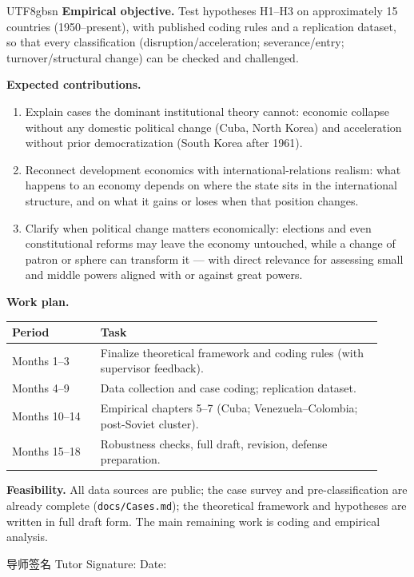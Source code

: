 \documentclass[10pt]{article}
\begin{document}
\begin{CJK}{UTF8}{gbsn}
\noindent\textbf{Empirical objective.} Test hypotheses H1--H3 on approximately 15 countries (1950--present), with published coding rules and a replication dataset, so that every classification (disruption/acceleration; severance/entry; turnover/structural change) can be checked and challenged.

\noindent\textbf{Expected contributions.}
\begin{enumerate}
    \item Explain cases the dominant institutional theory cannot: economic collapse without any domestic political change (Cuba, North Korea) and acceleration without prior democratization (South Korea after 1961).
    \item Reconnect development economics with international-relations realism: what happens to an economy depends on where the state sits in the international structure, and on what it gains or loses when that position changes.
    \item Clarify when political change matters economically: elections and even constitutional reforms may leave the economy untouched, while a change of patron or sphere can transform it --- with direct relevance for assessing small and middle powers aligned with or against great powers.
\end{enumerate}

\noindent\textbf{Work plan.}
\begin{center}\small
\begin{tabular}{p{0.22\linewidth} p{0.70\linewidth}}
\toprule
\textbf{Period} & \textbf{Task} \\
\midrule
Months 1--3 & Finalize theoretical framework and coding rules (with supervisor feedback). \\
Months 4--9 & Data collection and case coding; replication dataset. \\
Months 10--14 & Empirical chapters 5--7 (Cuba; Venezuela--Colombia; post-Soviet cluster). \\
Months 15--18 & Robustness checks, full draft, revision, defense preparation. \\
\bottomrule
\end{tabular}
\end{center}

\noindent\textbf{Feasibility.} All data sources are public; the case survey and pre-classification are already complete (\texttt{docs/Cases.md}); the theoretical framework and hypotheses are written in full draft form. The main remaining work is coding and empirical analysis.

\vspace{24pt}


\vspace{180pt}

\noindent 导师签名 Tutor Signature: \hrulefill\hspace{24pt}Date: \hrulefill

\end{CJK}
\end{document}
